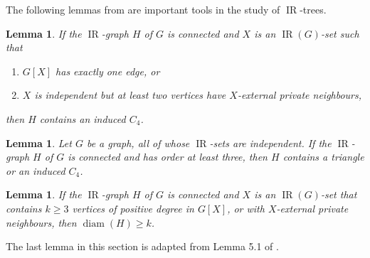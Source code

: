 \documentclass[12pt]{article}%
\newtheorem{lemma}[theorem]{Lemma}
\begin{document}
The following lemmas from \cite{mynhardt19} are important tools in the study
of $\operatorname{IR}$-trees.

\begin{lemma}
\label{IRCycle}\emph{\cite{mynhardt19}}\hspace{0.1in}If the $\operatorname{IR}%
$-graph $H$ of $G$ is connected and $X$ is an $\operatorname{IR}(G)$-set such that

\begin{enumerate}
\item[$(i)$] $G[X]$ has exactly one edge, or

\item[$(ii)$] $X$ is independent but at least two vertices have $X$-external
private neighbours,
\end{enumerate}

then $H$ contains an induced $C_{4}$.
\end{lemma}

\begin{lemma}
\label{independent}\emph{\cite{mynhardt19}}\hspace{0.1in}Let $G$ be a graph,
all of whose $\operatorname{IR}$-sets are independent. If the
$\operatorname{IR}$-graph $H$ of $G$ is connected and has order at least
three, then $H$ contains a triangle or an induced $C_{4}$.
\end{lemma}

\begin{lemma}
\label{Lem_Number_IR-sets1}\emph{\cite{mynhardt19}}\hspace{0.1in}If the
$\operatorname{IR}$-graph $H$ of $G$ is connected and $X$ is an
$\operatorname{IR}(G)$-set that contains $k\geq3$ vertices of positive degree
in $G[X]$, or with $X$-external private neighbours, then $\operatorname{diam}%
(H)\geq k$.
\end{lemma}

The last lemma in this section is adapted from Lemma 5.1 of \cite{mynhardt19}.
\end{document}
